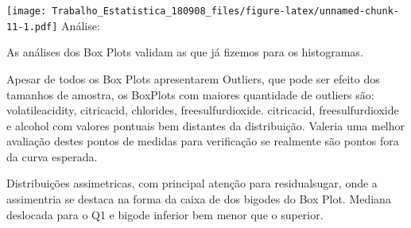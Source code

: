 \documentclass[]{article}
\newenvironment{Shaded}{\begin{snugshade}}{\end{snugshade}}
\newcommand{\KeywordTok}[1]{\textcolor[rgb]{0.13,0.29,0.53}{\textbf{#1}}}
\newcommand{\DataTypeTok}[1]{\textcolor[rgb]{0.13,0.29,0.53}{#1}}
\newcommand{\DecValTok}[1]{\textcolor[rgb]{0.00,0.00,0.81}{#1}}
\newcommand{\StringTok}[1]{\textcolor[rgb]{0.31,0.60,0.02}{#1}}
\newcommand{\CommentTok}[1]{\textcolor[rgb]{0.56,0.35,0.01}{\textit{#1}}}
\newcommand{\OperatorTok}[1]{\textcolor[rgb]{0.81,0.36,0.00}{\textbf{#1}}}
\newcommand{\NormalTok}[1]{#1}
\begin{document}
\begin{Shaded}
\end{Shaded}

\texttt{[image: Trabalho\_Estatistica\_180908\_files/figure-latex/unnamed-chunk-11-1.pdf]}
Análise:

As análises dos Box Plots validam as que já fizemos para os histogramas.

Apesar de todos os Box Plots apresentarem Outliers, que pode ser efeito
dos tamanhos de amostra, os BoxPlots com maiores quantidade de outliers
são: volatileacidity, citricacid, chlorides, freesulfurdioxide.
citricacid, freesulfurdioxide e alcohol com valores pontuais bem
distantes da distribuição. Valeria uma melhor avaliação destes pontos de
medidas para verificação se realmente são pontos fora da curva esperada.

Distribuições assimetricas, com principal atenção para residualsugar,
onde a assimentria se destaca na forma da caixa de dos bigodes do Box
Plot. Mediana deslocada para o Q1 e bigode inferior bem menor que o
superior.
\end{document}
